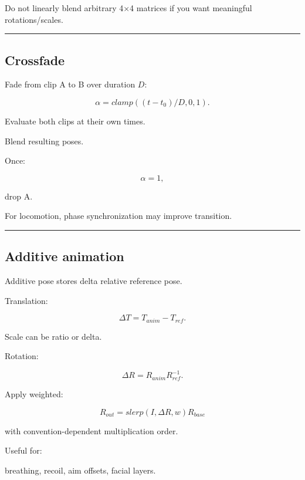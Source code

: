 Do not linearly blend arbitrary 4×4 matrices if you want meaningful rotations/scales.

\begin{center}\rule{0.5\linewidth}{0.5pt}\end{center}

\subsection{Crossfade}\label{04-visual-computing-ii-ch041-crossfade}

\hypertarget{04-visual-computing-ii-ch041-crossfade}{}

Fade from clip A to B over duration \(D\):

\[
\alpha=
clamp(
(t-t_0)/D,
0,1
).
\]

Evaluate both clips at their own times.

Blend resulting poses.

Once:

\[
\alpha=1,
\]

drop A.

For locomotion, phase synchronization may improve transition.

\begin{center}\rule{0.5\linewidth}{0.5pt}\end{center}

\subsection{Additive animation}\label{04-visual-computing-ii-ch041-additive-animation}

\hypertarget{04-visual-computing-ii-ch041-additive-animation}{}

Additive pose stores delta relative reference pose.

Translation:

\[
\Delta T=
T_{anim}-T_{ref}.
\]

Scale can be ratio or delta.

Rotation:

\[
\Delta R=
R_{anim}R_{ref}^{-1}.
\]

Apply weighted:

\[
R_{out}
=
slerp(
I,
\Delta R,
w
)
R_{base}
\]

with convention-dependent multiplication order.

Useful for:

breathing, recoil, aim offsets, facial layers.

